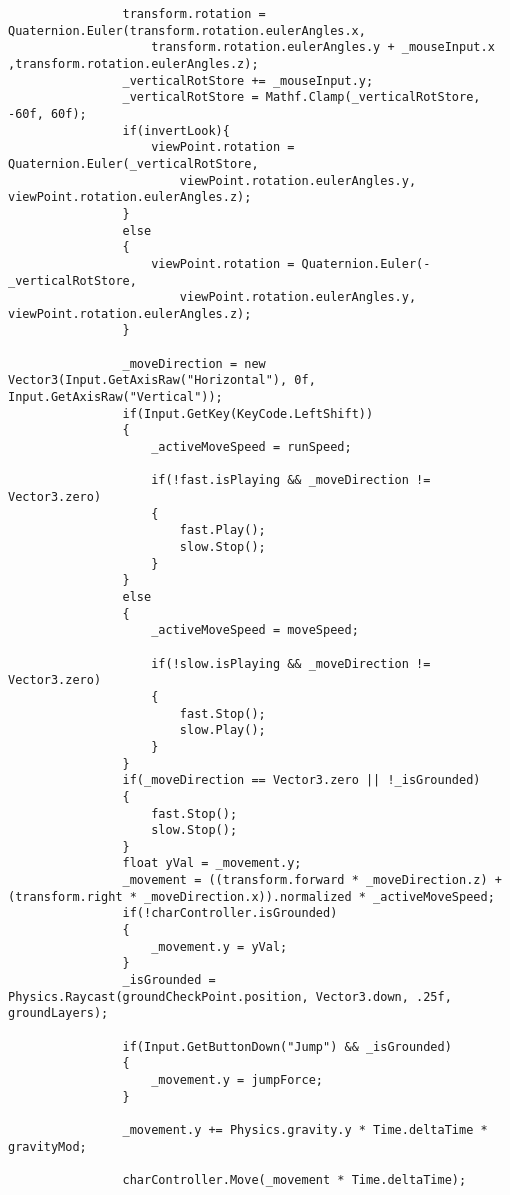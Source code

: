 \begin{enumerate}
\begin{lstlisting}
                transform.rotation = Quaternion.Euler(transform.rotation.eulerAngles.x, 
                    transform.rotation.eulerAngles.y + _mouseInput.x ,transform.rotation.eulerAngles.z);
                _verticalRotStore += _mouseInput.y;
                _verticalRotStore = Mathf.Clamp(_verticalRotStore, -60f, 60f);
                if(invertLook){
                    viewPoint.rotation = Quaternion.Euler(_verticalRotStore, 
                        viewPoint.rotation.eulerAngles.y, viewPoint.rotation.eulerAngles.z);
                }
                else
                {
                    viewPoint.rotation = Quaternion.Euler(-_verticalRotStore, 
                        viewPoint.rotation.eulerAngles.y, viewPoint.rotation.eulerAngles.z);
                }
    
                _moveDirection = new Vector3(Input.GetAxisRaw("Horizontal"), 0f, Input.GetAxisRaw("Vertical"));
                if(Input.GetKey(KeyCode.LeftShift))
                {
                    _activeMoveSpeed = runSpeed;
    
                    if(!fast.isPlaying && _moveDirection != Vector3.zero)
                    {
                        fast.Play();
                        slow.Stop();
                    }
                }
                else
                {
                    _activeMoveSpeed = moveSpeed;
    
                    if(!slow.isPlaying && _moveDirection != Vector3.zero)
                    {
                        fast.Stop();
                        slow.Play();
                    }
                }
                if(_moveDirection == Vector3.zero || !_isGrounded)
                {
                    fast.Stop();
                    slow.Stop();
                }
                float yVal = _movement.y;
                _movement = ((transform.forward * _moveDirection.z) + (transform.right * _moveDirection.x)).normalized * _activeMoveSpeed;
                if(!charController.isGrounded)
                {
                    _movement.y = yVal;
                }
                _isGrounded = Physics.Raycast(groundCheckPoint.position, Vector3.down, .25f, groundLayers);
    
                if(Input.GetButtonDown("Jump") && _isGrounded)
                {
                    _movement.y = jumpForce;
                }
    
                _movement.y += Physics.gravity.y * Time.deltaTime * gravityMod;
    
                charController.Move(_movement * Time.deltaTime);
    

\end{lstlisting}
\end{enumerate}
